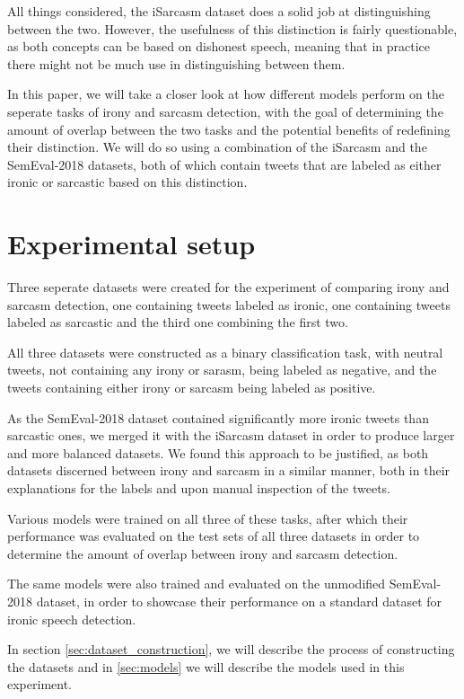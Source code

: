 \documentclass[10pt, a4paper]{article}
\begin{document}
All things considered, the iSarcasm \citep{iSarcasm} dataset
does a solid job at distinguishing between the two. However, the usefulness of this distinction is fairly questionable, 
as both concepts can be based on dishonest speech, meaning that in practice there might not be much use in distinguishing
 between them.

In this paper, we will take a closer look at how different models perform on the seperate tasks of irony and sarcasm detection,
with the goal of determining the amount of overlap between the two tasks and the potential benefits of redefining their distinction.
We will do so using a combination of the iSarcasm \citep{iSarcasm} and the SemEval-2018 \citep{semeval-2018} 
datasets, both of which contain tweets that are labeled as either ironic or sarcastic based on this distinction.

\section{Experimental setup}

Three seperate datasets were created for the experiment of comparing irony and sarcasm detection, one containing tweets labeled
as ironic, one containing tweets labeled as sarcastic and the third one combining the first two.

All three datasets were constructed as a binary classification task, with neutral tweets, not containing any irony or sarasm,
being labeled as negative, and the tweets containing either irony or sarcasm being labeled as positive.

As the SemEval-2018 dataset contained significantly more
ironic tweets than sarcastic ones, we merged it with the iSarcasm dataset in order to produce larger and more balanced datasets.
We found this approach to be justified, as both datasets discerned between irony and sarcasm in a similar manner, both in
their explanations for the labels and upon manual inspection of the tweets. 

Various models were trained on all three of these tasks, after which their performance was evaluated on the test sets of all
three datasets in order to determine the amount of overlap between irony and sarcasm detection.

The same models were also trained and evaluated on the unmodified SemEval-2018 dataset, in order to showcase their performance
on a standard dataset for ironic speech detection.

In section \ref{sec:dataset_construction}, we will describe the process of constructing the datasets and in \ref{sec:models}
we will describe the models used in this experiment.
\end{document}
